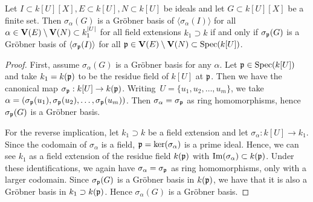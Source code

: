 \begin{lemma}\label{lem:sigma_p_sigma_alpha}
  Let $I \subset k[U][X], E \subset k[U], N \subset k[U]$ be ideals and let $G \subset k[U][X]$ be a finite set. Then $\sigma_{\alpha}(G)$ is a Gröbner basis of $\langle \sigma_{\alpha}(I) \rangle$ for all $\alpha \in \operatorname{\mathbf V}(E) \setminus \operatorname{\mathbf V}(N) \subset k_{1}^{|U|}$ for all field extensions $k_{1} \supset k$ if and only if $\sigma_{\mathfrak p}(G)$ is a Gröbner basis of $\langle \sigma_{\mathfrak p}(I) \rangle$ for all $\mathfrak p \in \operatorname{\mathbf V}(E) \setminus \operatorname{\mathbf V}(N) \subset \operatorname{Spec}(k[U])$.
\end{lemma}
\begin{proof}
  First, assume $\sigma_{\alpha}(G)$ is a Gröbner basis for any $\alpha$. Let $\mathfrak p \in \operatorname{Spec}(k[U])$ and take $k_{1} = k(\mathfrak p)$ to be the residue field of $k[U]$ at $\mathfrak p$. Then we have the canonical map $\sigma_{\mathfrak p} : k[U] \to k(\mathfrak p)$. Writing $\,U = \{u_{1}, u_{2}, \dots, u_{m}\}$, we take $\alpha = (\sigma_{\mathfrak p}(u_{1}), \sigma_{\mathfrak p}(u_{2}), \dots, \sigma_{\mathfrak p}(u_{m}))$. Then $\sigma_{\alpha} = \sigma_{\mathfrak p}$ as ring homomorphisms, hence $\sigma_{\mathfrak p}(G)$ is a Gröbner basis.

  For the reverse implication, let $k_{1} \supset k$ be a field extension and let $\sigma_{\alpha} : k[U] \to k_{1}$. Since the codomain of $\sigma_{\alpha}$ is a field, $\mathfrak p = \ker(\sigma_{\alpha})$ is a prime ideal. Hence, we can see $k_{1}$ as a field extension of the residue field $k(\mathfrak p)$ with $\operatorname{Im}(\sigma_{\alpha}) \subset k(\mathfrak p)$. Under these identifications, we again have $\sigma_{\alpha} = \sigma_{\mathfrak p}$ as ring homomorphisms, only with a larger codomain. Since $\sigma_{\mathfrak p}(G)$ is a Gröbner basis in $k(\mathfrak p)$, we have that it is also a Gröbner basis in $k_{1} \supset k(\mathfrak p)$. Hence $\sigma_{\alpha}(G)$ is a Gröbner basis.
\end{proof}


